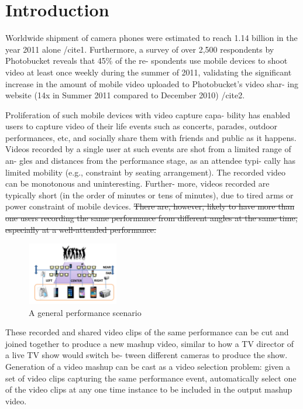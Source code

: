 \documentclass{sig-alternate}
\providecommand{\DIFadd}[1]{{\protect\color{blue}\uwave{#1}}} %
\providecommand{\DIFdel}[1]{{\protect\color{red}\sout{#1}}}                      %
\providecommand{\DIFaddbegin}{} %
\providecommand{\DIFaddend}{} %
\providecommand{\DIFdelbegin}{} %
\providecommand{\DIFdelend}{} %
\begin{document}




\section{Introduction}
 Worldwide shipment of camera phones were estimated to reach
1.14 billion in the year 2011 alone /cite{1}. Furthermore, a survey of
over 2,500 respondents by Photobucket reveals that 45\% of the re-
spondents use mobile devices to shoot video at least once weekly during the summer of 2011, validating the significant increase in
the amount of mobile video uploaded to Photobucket's video shar-
ing website (14x in Summer 2011 compared to December 2010) /cite{2}.

Proliferation of such mobile devices with video capture capa-
bility has enabled users to capture video of their life events such
as concerts, parades, outdoor performances, etc, and socially share
them with friends and public as it happens. Videos recorded by
a single user at such events are shot from a limited range of an-
gles and distances from the performance stage, as an attendee typi-
cally has limited mobility (e.g., constraint by seating arrangement).
The recorded video can be monotonous and uninteresting. Further-
more, videos recorded are typically short (in the order of minutes
or tens of minutes), due to tired arms or power constraint of mobile
devices. \DIFdelbegin \DIFdel{There are, however, likely to have more than one users
recording the same performance from different angles at the same
time, especially at a well-attended performance.
}\DIFdelend \DIFaddbegin \DIFadd{this is introduction
}\DIFaddend 

\begin{figure}[htp]
\centering
\includegraphics[width=4cm]{images/img1.png}
\caption{A general performance scenario}
\end{figure}


These recorded and shared video clips of the same performance
can be cut and joined together to produce a new mashup video,
similar to how a TV director of a live TV show would switch be-
tween different cameras to produce the show. Generation of a video
mashup can be cast as a video selection problem: given a set of
video clips capturing the same performance event, automatically
select one of the video clips at any one time instance to be included
in the output mashup video.
\end{document}
